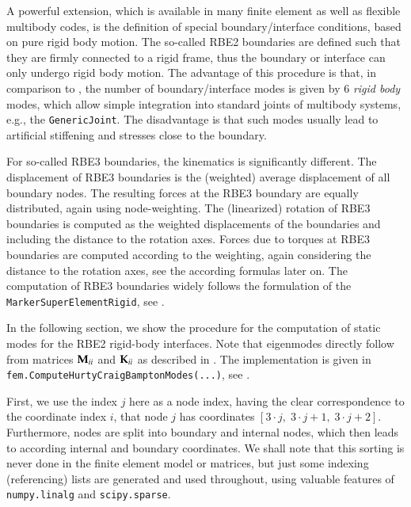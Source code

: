 A powerful extension, which is available in many finite element as well as flexible multibody codes, is the definition of special boundary/interface conditions, based on pure rigid body motion.
The so-called RBE2 boundaries are defined such that they are firmly connected to a rigid frame, thus the boundary or interface can only undergo rigid body motion.
The advantage of this procedure is that, in comparison to , the number of boundary/interface modes is given by 6 {\it rigid body} modes, which allow simple integration into standard joints of multibody systems, e.g., the \texttt{GenericJoint}.
The disadvantage is that such modes usually lead to artificial stiffening and stresses close to the boundary.

For so-called RBE3 boundaries, the kinematics is significantly different. The displacement of RBE3 boundaries is the (weighted) average displacement of all boundary nodes. The resulting forces at the RBE3 boundary are equally distributed, again using node-weighting.
The (linearized) rotation of RBE3 boundaries is computed as the weighted displacements of the boundaries and including the distance to the rotation axes. 
Forces due to torques at RBE3 boundaries are computed according to the weighting, again considering the distance to the rotation axes, see the according formulas later on. The computation of RBE3 boundaries widely follows the formulation of the \texttt{MarkerSuperElementRigid}, see .

In the following section, we show the procedure for the computation of static modes for the RBE2 rigid-body interfaces.
Note that eigenmodes directly follow from matrices $\mathbf{M}_{ii}$ and $\mathbf{K}_{ii}$ as described in .
The implementation is given in \texttt{fem.ComputeHurtyCraigBamptonModes(...)}, see .

First, we use the index $j$ here as a node index, having the clear correspondence to the coordinate index $i$, that node $j$ has coordinates 
$[3\cdot j,\; 3\cdot j+1,\; 3\cdot j+2]$.
Furthermore, nodes are split into boundary and internal nodes, which then leads to according internal and boundary coordinates.
We shall note that this sorting is never done in the finite element model or matrices, but just some indexing (referencing) lists are generated and used throughout, using valuable features of \texttt{numpy.linalg} and \texttt{scipy.sparse}.

